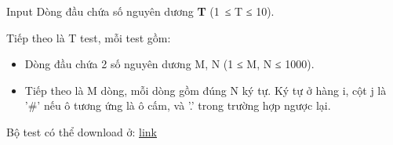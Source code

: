 Input  
Dòng đầu chứa số nguyên dương   \textbf{    T   }   (1 ≤ T ≤ 10).  

   Tiếp theo là T test, mỗi test gồm:  
\begin{itemize}
	\item     Dòng đầu chứa 2 số nguyên dương M, N (1 ≤ M, N ≤ 1000).   
	\item     Tiếp theo là M dòng, mỗi dòng gồm đúng N ký tự. Ký tự ở hàng i, cột j là '\#' nếu ô tương ứng là ô cấm, và '.' trong trường hợp ngược lại.   
\end{itemize}

   Bộ test có thể download ở:   \href{../../../content/voj:VMTILE}{    link   }